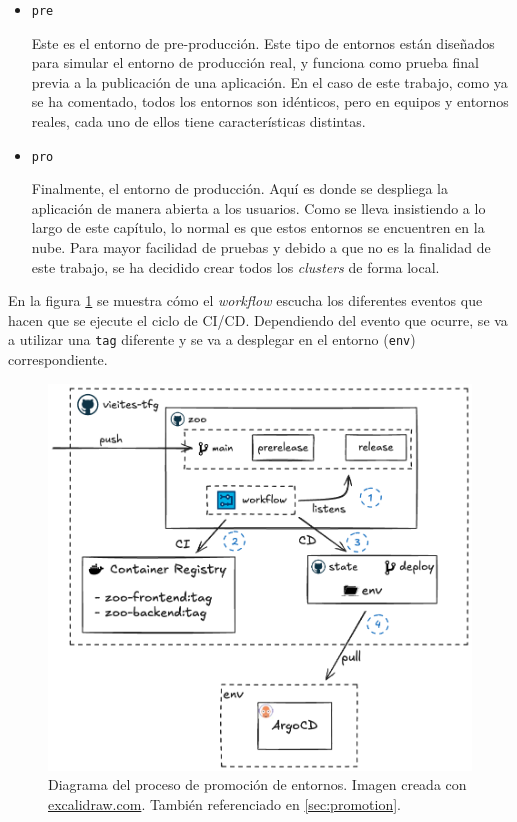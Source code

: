 \begin{itemize}
  \item \texttt{pre}

    Este es el entorno de pre-producción. Este tipo de entornos están diseñados para simular el entorno de producción real, y funciona como prueba final previa a la publicación de una aplicación. En el caso de este trabajo, como ya se ha comentado, todos los entornos son idénticos, pero en equipos y entornos reales, cada uno de ellos tiene características distintas.

  \item \texttt{pro}

    Finalmente, el entorno de producción. Aquí es donde se despliega la aplicación de manera abierta a los usuarios. Como se lleva insistiendo a lo largo de este capítulo, lo normal es que estos entornos se encuentren en la nube. Para mayor facilidad de pruebas y debido a que no es la finalidad de este trabajo, se ha decidido crear todos los \textit{clusters} de forma local.

\end{itemize}

En la figura \ref{fig:promotion} se muestra cómo el \textit{workflow} escucha los diferentes eventos que hacen que se ejecute el ciclo de CI/CD. Dependiendo del evento que ocurre, se va a utilizar una \texttt{tag} diferente y se va a desplegar en el entorno (\texttt{env}) correspondiente.

\begin{figure}[h]
  \centerline{\includegraphics[width=13cm]{figuras/promotion}}
  \caption{Diagrama del proceso de promoción de entornos. Imagen creada con \href{https://excalidraw.com}{excalidraw.com}. También referenciado en \ref{sec:promotion}.}
  \label{fig:promotion}
\end{figure}


